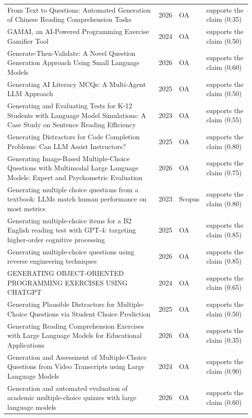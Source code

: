 \begin{longtable}{@{}%
  >{\raggedright\arraybackslash}p{}c%
  >{\raggedright\arraybackslash}p{}%
  >{\raggedright\arraybackslash}p{}@{}}
From Text to Questions: Automated Generation of Chinese Reading Comprehension Tasks & 2026 & OA & supports the claim (0.35) \\
GAMAI, an AI-Powered Programming Exercise Gamifier Tool & 2024 & OA & supports the claim (0.50) \\
Generate-Then-Validate: A Novel Question Generation Approach Using Small Language Models & 2026 & OA & supports the claim (0.60) \\
Generating AI Literacy MCQs: A Multi-Agent LLM Approach & 2025 & OA & supports the claim (0.50) \\
Generating and Evaluating Tests for K-12 Students with Language Model Simulations: A Case Study on Sentence Reading Efficiency & 2023 & OA & supports the claim (0.55) \\
Generating Distractors for Code Completion Problems: Can LLM Assist Instructors? & 2025 & OA & supports the claim (0.80) \\
Generating Image-Based Multiple-Choice Questions with Multimodal Large Language Models: Expert and Psychometric Evaluation & 2026 & OA & supports the claim (0.75) \\
Generating multiple choice questions from a textbook: LLMs match human performance on most metrics & 2023 & Scopus & supports the claim (0.80) \\
Generating multiple-choice items for a B2 English reading test with GPT-4: targeting higher-order cognitive processing & 2025 & OA & supports the claim (0.85) \\
Generating multiple-choice questions using reverse engineering techniques & 2026 & OA & supports the claim (0.85) \\
GENERATING OBJECT-ORIENTED PROGRAMMING EXERCISES USING CHATGPT & 2024 & OA & supports the claim (0.65) \\
Generating Plausible Distractors for Multiple-Choice Questions via Student Choice Prediction & 2025 & OA & supports the claim (0.50) \\
Generating Reading Comprehension Exercises with Large Language Models for Educational Applications & 2026 & OA & supports the claim (0.35) \\
Generation and Assessment of Multiple-Choice Questions from Video Transcripts using Large Language Models & 2024 & OA & supports the claim (0.90) \\
Generation and automated evaluation of academic multiple-choice quizzes with large language models & 2026 & OA & supports the claim (0.60) \\

\end{longtable}
